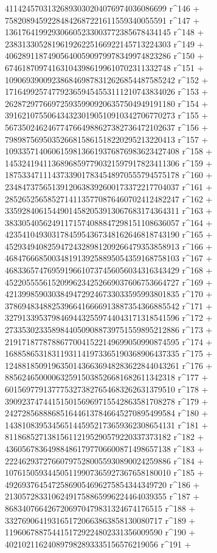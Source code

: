        41142457031326893030204076974036086699 r^146 + 
       75820894592284842687221611559340055591 r^147 + 
       136176419929306605233003772385678434145 r^148 + 
       238313305281961926225166922145713224303 r^149 + 
       406289118749056400590979978349974823286 r^150 + 
       674618709741631043986199610702311332748 r^151 + 
       1090693900923868469878312626854487585242 r^152 + 
       1716499257477923659454553111210743834026 r^153 + 
       2628729776697259359909206357504949191180 r^154 + 
       3916210755064343230190510910342706770273 r^155 + 
       5673502462467747664988627382736472102637 r^156 + 
       7989875695035266815861518220295213220413 r^157 + 
       10933571406061598136619376876983623427408 r^158 + 
       14532419411368968597790321597917823411306 r^159 + 
       18753347111437339017834548970555794575178 r^160 + 
       23484737565139120638392600173372217704037 r^161 + 
       28526525658527141135770876460702412482247 r^162 + 
       33592840615449014582053913067683174364311 r^163 + 
       38330540562491171574088847298151108636057 r^164 + 
       42354104930317845954367348162646818743190 r^165 + 
       45293494082594724328981209266479353858913 r^166 + 
       46847666850034819139258895054359168758103 r^167 + 
       46833657476959196610737456056034316343429 r^168 + 
       45220555561520996234252669037606753664727 r^169 + 
       42139985903038494729246733033595993801835 r^170 + 
       37869483488253966416666913887354366885542 r^171 + 
       32791339537984694432559744043171318541596 r^172 + 
       27335302335898440509088739751559895212886 r^173 + 
       21917187787886770041522149699050990874595 r^174 + 
       16885865318311931141973365190368906437335 r^175 + 
       12488185091963501436636948283622844043261 r^176 + 
       8856246500006325915038526681682611342318 r^177 + 
       6015697791377753273827654683262631379510 r^178 + 
       3909237474415150156969715542863581708278 r^179 + 
       2427285688868516446137846645270895499584 r^180 + 
       1438108395345651445952173659362308654131 r^181 + 
       811868527138156112195290579220337373182 r^182 + 
       436056783649884861797706600871498657138 r^183 + 
       222462937276607975280055930890024259886 r^184 + 
       107615059344505119907365927367658180010 r^185 + 
       49269376454725869054696275854344349720 r^186 + 
       21305728331062491758865996224464039355 r^187 + 
       8683407664267206970479831324674176515 r^188 + 
       3327690641931651720663863858130080717 r^189 + 
       1196067887544151729224802331356009590 r^190 + 
       402102116240897982893335156576219056 r^191 + 
